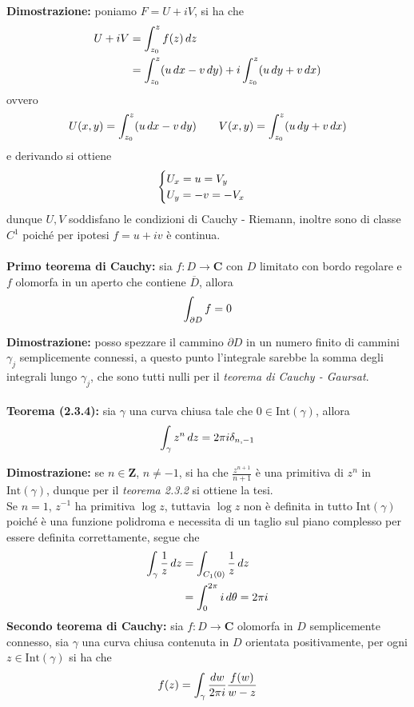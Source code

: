 \documentclass{article}
\begin{document}
\textbf{Dimostrazione:} poniamo $F = U + iV$, si ha che
\begin{align}
    U + iV &= \int_{z_0}^z f(z) \, dz \notag \\
    &= \int_{z_0}^z(u \, dx - v \, dy) + i\int_{z_0}^z(u \, dy + v \, dx) \notag
\end{align}
ovvero
\begin{gather}
    U(x, y) = \int_{z_0}^z(u \, dx - v \, dy) \qquad V(x, y) = \int_{z_0}^z(u \, dy + v \, dx) \notag
\end{gather}
e derivando si ottiene
\begin{gather}
    \begin{cases}
        U_x = u = V_y \\
        U_y = -v = -V_x
    \end{cases} \notag
\end{gather}
dunque $U, V$ soddisfano le condizioni di Cauchy - Riemann, inoltre sono di classe $C^1$ poiché per ipotesi $f = u + iv$ è continua. \\ \\
\textbf{Primo teorema di Cauchy:} sia $f : D \longrightarrow \mathbf{C}$ con $D$ limitato con bordo regolare e $f$ olomorfa in un aperto che contiene $\overline{D}$, allora
\begin{gather}
    \int_{\partial D} f = 0 \notag
\end{gather}

\textbf{Dimostrazione:} posso spezzare il cammino $\partial D$ in un numero finito di cammini $\gamma_j$ semplicemente connessi, a questo punto l'integrale sarebbe la somma degli integrali lungo $\gamma_j$, che sono tutti nulli per il \textit{teorema di Cauchy - Gaursat}. \\ \\
\textbf{Teorema (2.3.4):} sia $\gamma$ una curva chiusa tale che $0 \in \mathrm{Int}(\gamma)$, allora
\begin{gather}
    \int_\gamma z^n \, dz = 2\pi i\delta_{n, -1} \notag
\end{gather}

\textbf{Dimostrazione:} se $n \in \mathbf{Z}$, $n \neq -1$, si ha che $\frac{z^{n+1}}{n + 1}$ è una primitiva di $z^n$ in $\mathrm{Int}(\gamma)$, dunque per il \textit{teorema 2.3.2} si ottiene la tesi. \\
Se $n = 1$, $z^{-1}$ ha primitiva $\log z$, tuttavia $\log z$ non è definita in tutto $\mathrm{Int}(\gamma)$ poiché è una funzione polidroma e necessita di un taglio sul piano complesso per essere definita correttamente, segue che
\begin{align}
    \int_\gamma \frac{1}{z} \, dz &= \int_{C_1(0)}\frac{1}{z} \, dz \notag \\
    &= \int_0^{2\pi}i \, d\theta = 2\pi i \notag
\end{align}
\textbf{Secondo teorema di Cauchy:} sia $f : D \longrightarrow \mathbf{C}$ olomorfa in $D$ semplicemente connesso, sia $\gamma$ una curva chiusa contenuta in $D$ orientata positivamente, per ogni $z \in \mathrm{Int}(\gamma)$ si ha che
\begin{gather}
    f(z) = \int_{\gamma} \frac{dw}{2\pi i}\frac{f(w)}{w - z} \notag
\end{gather}
\end{document}
